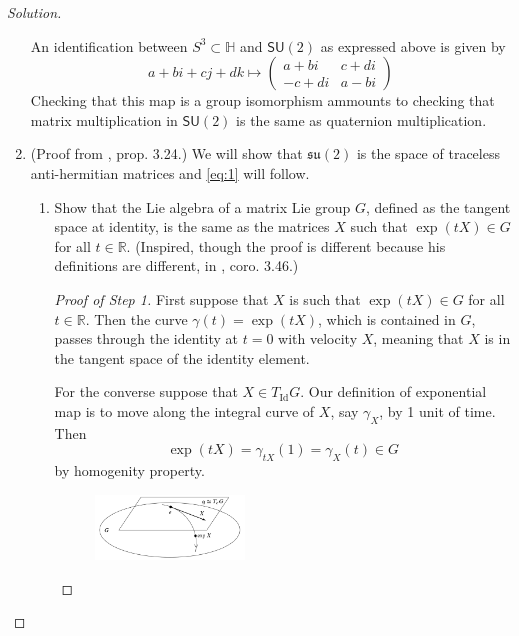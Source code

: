 \begin{proof}[Solution]
\begin{enumerate}[label=\alph*.]
			An identification between $S^3\subset \mathbb{H}$ and $\mathsf{SU}(2)$ as expressed above is given by
			\[a+bi+cj+dk\longmapsto \begin{pmatrix} a+bi&c+di\\-c+di&a-bi\end{pmatrix} \]
			Checking that this map is a group isomorphism ammounts to checking that matrix multiplication in $\mathsf{SU}(2)$ is the same as quaternion multiplication.


			\item (Proof from \cite{hall}, prop. 3.24.) We will show that $\mathfrak{su}(2)$ is the space of traceless anti-hermitian matrices and \cref{eq:1} will follow.
				\begin{enumerate}[label=\textbf{Step \arabic*}]
					\item Show that the Lie algebra of a matrix Lie group $G$, defined as the tangent space at identity, is the same as the matrices $X$ such that $ \operatorname{exp}(tX) \in G$ for all $t\in\mathbb{R}$. (Inspired, though the proof is different because his definitions are different, in \cite{hall}, coro. 3.46.)

						\begin{proof}[Proof of Step 1]\leavevmode
							First suppose that $X$ is such that $\operatorname{exp}(tX)\in G$ for all $t\in\mathbb{R}$. Then the curve $\gamma(t)=\operatorname{exp}(tX)$, which is contained in $G$, passes through the identity at $t=0$ with velocity $X$, meaning that $X$ is in the tangent space of the identity element.

							For the converse suppose that $X \in T_{\operatorname{Id}}G$. Our definition of exponential map is to move along the integral curve of $X$, say $\gamma_X$, by 1 unit of time. Then
							\[\operatorname{exp}(tX) =\gamma_{tX}(1)=\gamma_X(t)\in G\]
							by homogenity property.

	\begin{figure}[H]		\centering
		\includegraphics[width=0.4\textwidth]{fig2}	
	\end{figure}
						\end{proof}


\end{enumerate}
\end{enumerate}
\end{proof}
